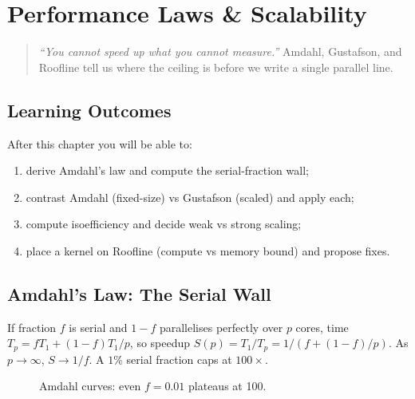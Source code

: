 \chapter{Performance Laws \& Scalability}\label{ch:perf-laws}

\begin{quote}
\emph{``You cannot speed up what you cannot measure.''} Amdahl, Gustafson, and Roofline tell us where the ceiling is before we write a single parallel line.
\end{quote}

\noindent{}

\section*{Learning Outcomes}
After this chapter you will be able to:
\begin{enumerate}[label=(L\arabic*)]
    \item derive Amdahl's law and compute the serial-fraction wall;
    \item contrast Amdahl (fixed-size) vs Gustafson (scaled) and apply each;
    \item compute isoefficiency and decide weak vs strong scaling;
    \item place a kernel on Roofline (compute vs memory bound) and propose fixes.
\end{enumerate}

\section{Amdahl's Law: The Serial Wall}\label{sec:amdahl}
If fraction $f$ is serial and $1-f$ parallelises perfectly over $p$ cores, time $T_p = fT_1 + (1-f)T_1/p$, so speedup $S(p)=T_1/T_p = 1/(f+(1-f)/p)$. As $p\to\infty$, $S\to1/f$. A $1\%$ serial fraction caps at $100\times$.

\begin{figure}[h]\centering
{}
\caption{Amdahl curves: even $f=0.01$ plateaus at 100.}
\label{fig:amdahl}
\end{figure}

